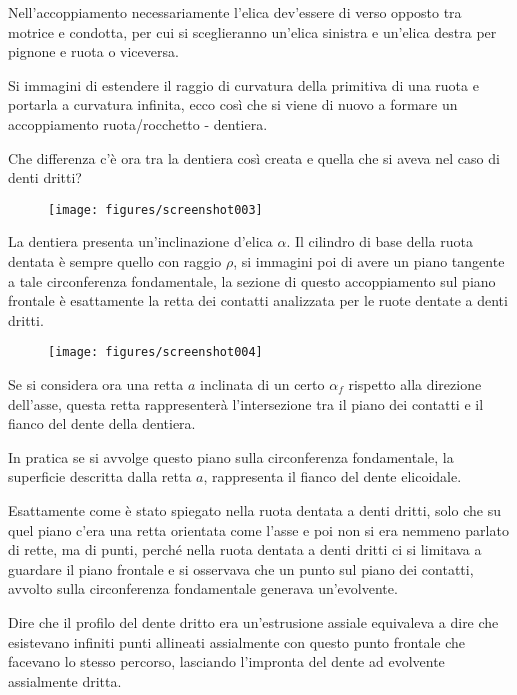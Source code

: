 \documentclass[a4paper, 15pt]{article}
\begin{document}
\begin{adjustwidth}{2in}{}
		Nell'accoppiamento necessariamente l'elica dev'essere di verso opposto tra motrice e condotta, per cui si sceglieranno un'elica sinistra e un'elica destra per pignone e ruota o viceversa. \newline 
		
		Si immagini di estendere il raggio di curvatura della primitiva di una ruota e portarla a curvatura infinita, ecco così che si viene di nuovo a formare un accoppiamento ruota/rocchetto - dentiera. 
		
		Che differenza c'è ora tra la dentiera così creata e quella che si aveva nel caso di denti dritti? 
		\begin{figure}[H]
			\centering
			\texttt{[image: figures/screenshot003]}
			\label{fig:screenshot003}
		\end{figure}
		La dentiera presenta un'inclinazione d'elica $\alpha$.  
\newpage		
		Il cilindro di base della ruota dentata è sempre quello con raggio $\rho$, si immagini poi di avere un piano tangente a tale circonferenza fondamentale, la sezione di questo accoppiamento sul piano frontale è esattamente la retta dei contatti analizzata per le ruote dentate a denti dritti. 
		\begin{figure}[H]
			\centering
			\texttt{[image: figures/screenshot004]}
			\label{fig:screenshot004}
		\end{figure}
		Se si considera ora una retta $a$ inclinata di un certo $\alpha_f$ rispetto alla direzione dell'asse, questa retta rappresenterà l'intersezione tra il piano dei contatti e il fianco del dente della dentiera. 
		
		In pratica se si avvolge questo piano  sulla circonferenza fondamentale, la superficie descritta dalla retta $a$, rappresenta  il fianco del dente elicoidale. 
		
		Esattamente come è stato spiegato nella ruota dentata a denti dritti, solo che su quel piano c'era una retta orientata come l'asse e poi non si era nemmeno parlato di rette, ma di punti, perché nella ruota dentata a denti dritti ci si limitava a guardare il piano frontale e si osservava che un punto sul piano dei contatti, avvolto sulla circonferenza fondamentale generava un'evolvente.  \newline 
		
		Dire che il profilo del dente dritto era un'estrusione assiale equivaleva a dire che esistevano infiniti punti allineati assialmente con questo punto frontale che facevano lo stesso percorso, lasciando l'impronta del dente ad evolvente assialmente dritta. \newline 
		

\end{adjustwidth}
\end{document}
